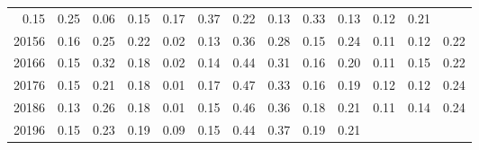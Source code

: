 \begin{table}[!h]
\begin{tabular}{lllllllllllll}
  \multicolumn{1}{|r}{0.15} &
  \multicolumn{1}{r}{0.25} &
  \multicolumn{1}{r}{0.06} &
  \multicolumn{1}{r}{0.15} &
  \multicolumn{1}{r}{0.17} &
  \multicolumn{1}{r}{0.37} &
  \multicolumn{1}{r}{0.22} &
  \multicolumn{1}{r}{0.13} &
  \multicolumn{1}{r}{0.33} &
  \multicolumn{1}{r}{0.13} &
  \multicolumn{1}{r}{0.12} &
  \multicolumn{1}{r}{0.21} \\
\multicolumn{1}{l}{\hspace{1em}20156} &
  \multicolumn{1}{|r}{0.16} &
  \multicolumn{1}{r}{0.25} &
  \multicolumn{1}{r}{0.22} &
  \multicolumn{1}{r}{0.02} &
  \multicolumn{1}{r}{0.13} &
  \multicolumn{1}{r}{0.36} &
  \multicolumn{1}{r}{0.28} &
  \multicolumn{1}{r}{0.15} &
  \multicolumn{1}{r}{0.24} &
  \multicolumn{1}{r}{0.11} &
  \multicolumn{1}{r}{0.12} &
  \multicolumn{1}{r}{0.22} \\
\multicolumn{1}{l}{\hspace{1em}20166} &
  \multicolumn{1}{|r}{0.15} &
  \multicolumn{1}{r}{0.32} &
  \multicolumn{1}{r}{0.18} &
  \multicolumn{1}{r}{0.02} &
  \multicolumn{1}{r}{0.14} &
  \multicolumn{1}{r}{0.44} &
  \multicolumn{1}{r}{0.31} &
  \multicolumn{1}{r}{0.16} &
  \multicolumn{1}{r}{0.20} &
  \multicolumn{1}{r}{0.11} &
  \multicolumn{1}{r}{0.15} &
  \multicolumn{1}{r}{0.22} \\
\multicolumn{1}{l}{\hspace{1em}20176} &
  \multicolumn{1}{|r}{0.15} &
  \multicolumn{1}{r}{0.21} &
  \multicolumn{1}{r}{0.18} &
  \multicolumn{1}{r}{0.01} &
  \multicolumn{1}{r}{0.17} &
  \multicolumn{1}{r}{0.47} &
  \multicolumn{1}{r}{0.33} &
  \multicolumn{1}{r}{0.16} &
  \multicolumn{1}{r}{0.19} &
  \multicolumn{1}{r}{0.12} &
  \multicolumn{1}{r}{0.12} &
  \multicolumn{1}{r}{0.24} \\
\multicolumn{1}{l}{\hspace{1em}20186} &
  \multicolumn{1}{|r}{0.13} &
  \multicolumn{1}{r}{0.26} &
  \multicolumn{1}{r}{0.18} &
  \multicolumn{1}{r}{0.01} &
  \multicolumn{1}{r}{0.15} &
  \multicolumn{1}{r}{0.46} &
  \multicolumn{1}{r}{0.36} &
  \multicolumn{1}{r}{0.18} &
  \multicolumn{1}{r}{0.21} &
  \multicolumn{1}{r}{0.11} &
  \multicolumn{1}{r}{0.14} &
  \multicolumn{1}{r}{0.24} \\
\multicolumn{1}{l}{\hspace{1em}20196} &
  \multicolumn{1}{|r}{0.15} &
  \multicolumn{1}{r}{0.23} &
  \multicolumn{1}{r}{0.19} &
  \multicolumn{1}{r}{0.09} &
  \multicolumn{1}{r}{0.15} &
  \multicolumn{1}{r}{0.44} &
  \multicolumn{1}{r}{0.37} &
  \multicolumn{1}{r}{0.19} &
  \multicolumn{1}{r}{0.21} &

\end{tabular}
\end{table}

